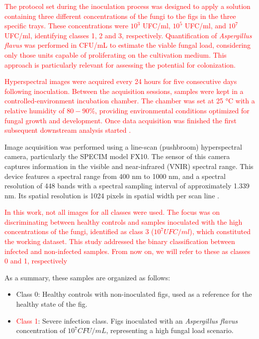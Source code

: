 \documentclass[aipa,article,submit,pdftex,moreauthors]{Definitions/mdpi}
\begin{document}
\textcolor{red}{The protocol set during the inoculation process was designed to apply a solution containing three different concentrations of the fungi to the figs in the three specific trays. These concentrations were $10^3$ UFC/ml,  $10^5$ UFC/ml, and $10^7$ UFC/ml, identifying classes 1, 2 and 3, respectively. Quantification of \textit{Aspergillus flavus} was performed in CFU/mL to estimate the viable fungal load, considering only those units capable of proliferating on the cultivation medium. This approach is particularly relevant for assessing the potential for colonization.}

\textcolor{red}{Hyperspectral images were acquired every 24 hours for five consecutive days following inoculation. Between the acquisition sessions, samples were kept in a controlled-environment incubation chamber. The chamber was set at 25 °C with a relative humidity of $80-90\%$, providing environmental conditions optimized for fungal growth and development. Once data acquisition was finished the first subsequent downstream analysis started \cite{cruz-carrasco_detection_2024}.}

Image acquisition was performed using a line-scan (pushbroom) hyperspectral camera, particularly the SPECIM model FX10.
The sensor of this camera captures information in the visible and near-infrared (VNIR) spectral range. 
This device features a spectral range from 400 nm to 1000 nm, and a spectral resolution of 448 bands with a spectral sampling interval of approximately 1.339 nm. 
Its spatial resolution is 1024 pixels in spatial width per scan line \cite{specim_specim_2020}.

\textcolor{red}{In this work, not all images for all classes were used. The focus was on discriminating between healthy controls and samples inoculated with the high concentrations of the fungi, identified as class 3 ($10^7 UFC/ml$), which constituted the working dataset. This study addressed the binary classification between infected and non-infected samples. From now on, we will refer to these as classes 0 and 1, respectively}



As a summary, these samples are organized as follows:

\begin{itemize}
    \item Class 0: Healthy controls with non-inoculated figs, used as a reference for the healthy state of the fig.
    \item \textcolor{red}{Class 1}: Severe infection class. Figs inoculated with an \textit{Aspergillus flavus} concentration of $10^7 CFU/mL$, representing a high fungal load scenario.
\end{itemize}
\end{document}
